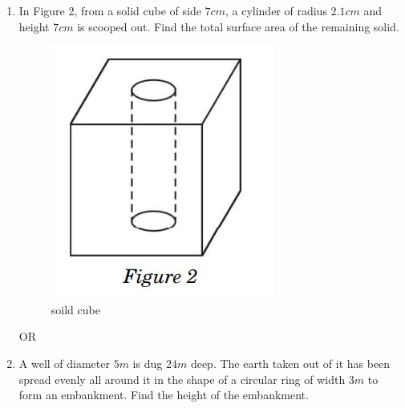 \documentclass{article}
\begin{document}
\begin{enumerate}
\item  In Figure 2, from a solid cube of side $7 cm$, a cylinder of radius $2.1 cm$ and height $7 cm$ is scooped out. Find the total surface area of the remaining solid.
\begin{figure}[H]
\centering
\includegraphics[width=\columnwidth]{figs/solid cube.png}
\caption{soild cube}
\label{tab:enter-label}
\end{figure}
\begin{center}
    OR
\end{center}
\item  A well of diameter $5 m$ is dug $24 m$ deep. The earth taken out of it has been spread evenly all around it in the shape of a circular ring of width $3 m$ to form an embankment. Find the height of the embankment.


\end{enumerate}
\end{document}
